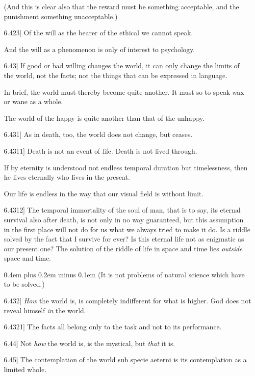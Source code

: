 \documentclass[12pt,oneside]{book}[2007/10/19]
\newcommand{\PropositionE}[2]{%
  \item[\phantomsection\label{PropE:#1}\PropGRef{#1}] #2%
}
\newcommand{\PropGRef}[1]{\hyperref[PropG:#1]{#1}}
\newcommand{\stretchyspace}{\spaceskip0.4em plus 0.2em minus 0.1em}
\begin{document}
\begin{propositions}
{(And this is clear also that the reward must be
something acceptable, and the punishment something
unacceptable.)}


\PropositionE{6.423}
{Of the will as the bearer of the ethical we cannot
speak.

And the will as a phenomenon is only of interest
to psychology.}


\PropositionE{6.43}
{If good or bad willing changes the world, it
can only change the limits of the world, not the
facts; not the things that can be expressed in
language.

In brief, the world must thereby become quite
another. It must so to speak wax or wane as a
whole.

The world of the happy is quite another than
that of the unhappy.}


\PropositionE{6.431}
{As in death, too, the world does not change,
but ceases.}


\PropositionE{6.4311}
{Death is not an event of life. Death is not lived
through.

If by eternity is understood not endless temporal
duration but timelessness, then he lives eternally
who lives in the present.

Our life is endless in the way that our visual
field is without limit.}


\PropositionE{6.4312}
{The temporal immortality of the soul of man,
that is to say, its eternal survival also after
death, is not only in no way guaranteed, but
this assumption in the first place will not do
for us what we always tried to make it do.
Is a riddle solved by the fact that I survive for
ever? Is this eternal life not as enigmatic as
our present one? The solution of the riddle of
life in space and time lies \emph{outside} space and
time.

{\stretchyspace
(It is not problems of natural science which have
to be solved.)}}


\PropositionE{6.432}
{\emph{How} the world is, is completely indifferent for
what is higher. God does not reveal himself \emph{in} the
world.}


\PropositionE{6.4321}
{The facts all belong only to the task and not to
its performance.}


\PropositionE{6.44}
{Not \emph{how} the world is, is the mystical, but \emph{that}
it is.}


\PropositionE{6.45}
{The contemplation of the world sub specie aeterni
is its contemplation as a limited whole.

}
\end{propositions}
\end{document}
